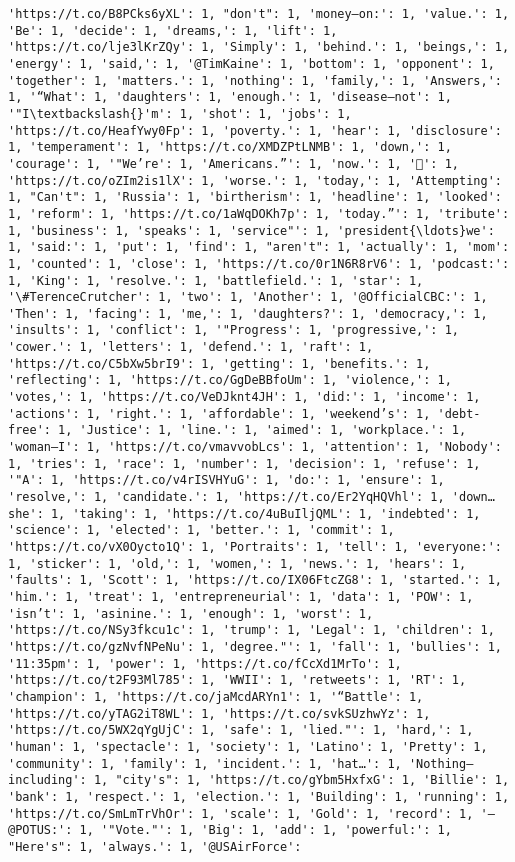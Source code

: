\documentclass[11pt]{article}
\begin{document}
\begin{Verbatim}[commandchars=\\\{\}]
'https://t.co/B8PCks6yXL': 1, "don't": 1, 'money—on:': 1, 'value.': 1, 'Be': 1, 'decide': 1, 'dreams,': 1, 'lift': 1, 'https://t.co/lje3lKrZQy': 1, 'Simply': 1, 'behind.': 1, 'beings,': 1, 'energy': 1, 'said,': 1, '@TimKaine': 1, 'bottom': 1, 'opponent': 1, 'together': 1, 'matters.': 1, 'nothing': 1, 'family,': 1, 'Answers,': 1, '“What': 1, 'daughters': 1, 'enough.': 1, 'disease—not': 1, '"I\textbackslash{}'m': 1, 'shot': 1, 'jobs': 1, 'https://t.co/HeafYwy0Fp': 1, 'poverty.': 1, 'hear': 1, 'disclosure': 1, 'temperament': 1, 'https://t.co/XMDZPtLNMB': 1, 'down,': 1, 'courage': 1, '"We’re': 1, 'Americans.”': 1, 'now.': 1, '🎤': 1, 'https://t.co/oZIm2is1lX': 1, 'worse.': 1, 'today,': 1, 'Attempting': 1, "Can't": 1, 'Russia': 1, 'birtherism': 1, 'headline': 1, 'looked': 1, 'reform': 1, 'https://t.co/1aWqDOKh7p': 1, 'today.”': 1, 'tribute': 1, 'business': 1, 'speaks': 1, 'service"': 1, 'president{\ldots}we': 1, 'said:': 1, 'put': 1, 'find': 1, "aren't": 1, 'actually': 1, 'mom': 1, 'counted': 1, 'close': 1, 'https://t.co/0r1N6R8rV6': 1, 'podcast:': 1, 'King': 1, 'resolve.': 1, 'battlefield.': 1, 'star': 1, '\#TerenceCrutcher': 1, 'two': 1, 'Another': 1, '@OfficialCBC:': 1, 'Then': 1, 'facing': 1, 'me,': 1, 'daughters?': 1, 'democracy,': 1, 'insults': 1, 'conflict': 1, '"Progress': 1, 'progressive,': 1, 'cower.': 1, 'letters': 1, 'defend.': 1, 'raft': 1, 'https://t.co/C5bXw5brI9': 1, 'getting': 1, 'benefits.': 1, 'reflecting': 1, 'https://t.co/GgDeBBfoUm': 1, 'violence,': 1, 'votes,': 1, 'https://t.co/VeDJknt4JH': 1, 'did:': 1, 'income': 1, 'actions': 1, 'right.': 1, 'affordable': 1, 'weekend’s': 1, 'debt-free': 1, 'Justice': 1, 'line.': 1, 'aimed': 1, 'workplace.': 1, 'woman—I': 1, 'https://t.co/vmavvobLcs': 1, 'attention': 1, 'Nobody': 1, 'tries': 1, 'race': 1, 'number': 1, 'decision': 1, 'refuse': 1, '"A': 1, 'https://t.co/v4rISVHYuG': 1, 'do:': 1, 'ensure': 1, 'resolve,': 1, 'candidate.': 1, 'https://t.co/Er2YqHQVhl': 1, 'down…she': 1, 'taking': 1, 'https://t.co/4uBuIljQML': 1, 'indebted': 1, 'science': 1, 'elected': 1, 'better.': 1, 'commit': 1, 'https://t.co/vX0Oycto1Q': 1, 'Portraits': 1, 'tell': 1, 'everyone:': 1, 'sticker': 1, 'old,': 1, 'women,': 1, 'news.': 1, 'hears': 1, 'faults': 1, 'Scott': 1, 'https://t.co/IX06FtcZG8': 1, 'started.': 1, 'him.': 1, 'treat': 1, 'entrepreneurial': 1, 'data': 1, 'POW': 1, 'isn’t': 1, 'asinine.': 1, 'enough': 1, 'worst': 1, 'https://t.co/NSy3fkcu1c': 1, 'trump': 1, 'Legal': 1, 'children': 1, 'https://t.co/gzNvfNPeNu': 1, 'degree."': 1, 'fall': 1, 'bullies': 1, '11:35pm': 1, 'power': 1, 'https://t.co/fCcXd1MrTo': 1, 'https://t.co/t2F93Ml785': 1, 'WWII': 1, 'retweets': 1, 'RT': 1, 'champion': 1, 'https://t.co/jaMcdARYn1': 1, '“Battle': 1, 'https://t.co/yTAG2iT8WL': 1, 'https://t.co/svkSUzhwYz': 1, 'https://t.co/5WX2qYgUjC': 1, 'safe': 1, 'lied."': 1, 'hard,': 1, 'human': 1, 'spectacle': 1, 'society': 1, 'Latino': 1, 'Pretty': 1, 'community': 1, 'family': 1, 'incident.': 1, 'hat…': 1, 'Nothing—including': 1, "city's": 1, 'https://t.co/gYbm5HxfxG': 1, 'Billie': 1, 'bank': 1, 'respect.': 1, 'election.': 1, 'Building': 1, 'running': 1, 'https://t.co/SmLmTrVhOr': 1, 'scale': 1, 'Gold': 1, 'record': 1, '—@POTUS:': 1, '"Vote."': 1, 'Big': 1, 'add': 1, 'powerful:': 1, "Here's": 1, 'always.': 1, '@USAirForce': 
\end{Verbatim}
\end{document}
